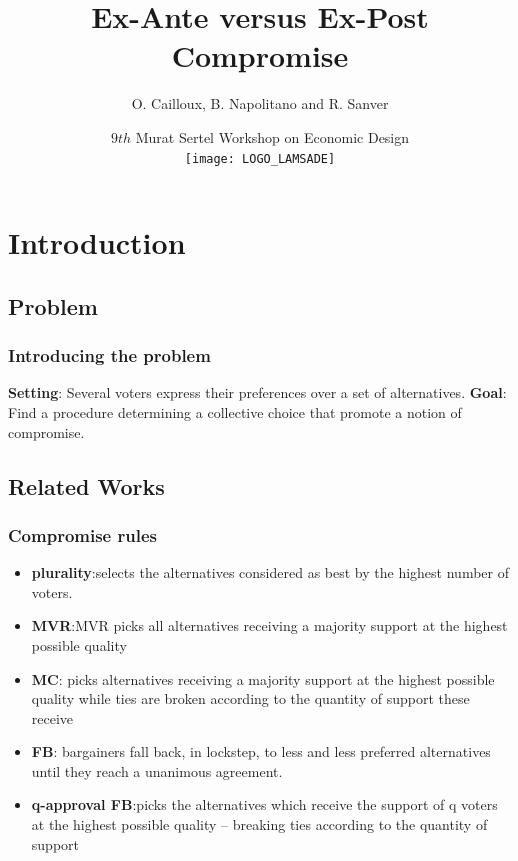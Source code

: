 \documentclass{beamer}
\title[Ex-Ante vs Ex-Post Compromise]{Ex-Ante versus Ex-Post Compromise}
\institute[]{LAMSADE, Université Paris-Dauphine, Paris, France}
\author[O. Cailloux, B. Napolitano, R. Sanver]{O. Cailloux, B. Napolitano and R. Sanver}
\date[31 Oct 2019]{{\small $9th$ Murat Sertel Workshop on Economic Design} \\ \texttt{[image: LOGO\_LAMSADE]} }
\begin{document}
\beamertemplatenavigationsymbolsempty

\begin{frame}[plain]
\maketitle
\end{frame}

\addtocounter{framenumber}{-1}


\section{Introduction}
\subsection{Problem}

\begin{frame}
\frametitle{Introducing the problem}
\textbf{Setting}: Several voters express their preferences over a set of alternatives. 
\textbf{Goal}: Find a procedure determining a collective choice that promote a notion of compromise.
\end{frame}

\subsection{Related Works}
\begin{frame}
	\frametitle{Compromise rules}
	\begin{itemize}
		\item \textbf{plurality}:selects the alternatives considered as best by the highest number of voters. 
		\item \textbf{MVR}:MVR picks all alternatives receiving a majority support at the highest
		possible quality
		\item \textbf{MC}: picks alternatives receiving a majority support at the highest possible quality while ties are broken according to the quantity of support these receive
		\item \textbf{FB}: bargainers fall back, in lockstep, to less and	less preferred alternatives until they reach a unanimous agreement. 
		\item \textbf{q-approval FB}:picks the alternatives which	receive the support of q voters at the highest possible quality – breaking ties according to the quantity of support
	\end{itemize}
\end{frame}
\end{document}

